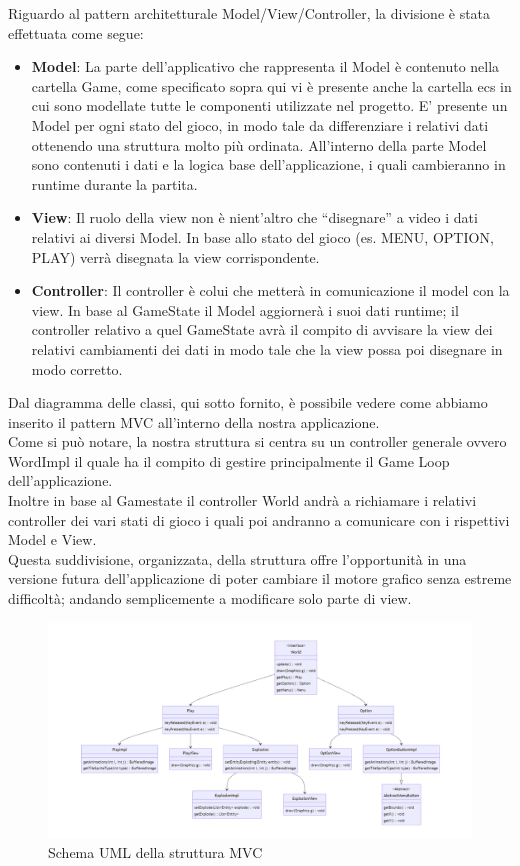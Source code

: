 \documentclass[a4paper,12pt]{report}
\begin{document}
Riguardo al pattern architetturale Model/View/Controller, la divisione è stata effettuata come segue:
\begin{itemize}
    \item \textbf{Model}: La parte dell’applicativo che rappresenta il Model è contenuto nella cartella Game, come specificato sopra qui vi è presente anche la cartella ecs in cui sono modellate tutte le componenti utilizzate nel progetto. E’ presente un Model per ogni stato del gioco, in modo tale da differenziare i relativi dati ottenendo una struttura molto più ordinata. All’interno della parte Model sono contenuti i dati e la logica base dell’applicazione, i quali cambieranno in runtime durante la partita.
    \item \textbf{View}: Il ruolo della view non è nient'altro che “disegnare” a video i dati relativi ai diversi Model. In base allo stato del gioco (es. MENU, OPTION, PLAY) verrà disegnata la view corrispondente.
    \item \textbf{Controller}: Il controller è colui che metterà in comunicazione il model con la view. In base al GameState il Model aggiornerà i suoi dati runtime; il controller relativo a quel GameState avrà il compito di avvisare la view dei relativi cambiamenti dei dati in modo tale che la view possa poi disegnare in modo corretto.
\end{itemize}
Dal diagramma delle classi, qui sotto fornito, è possibile vedere come abbiamo inserito il pattern MVC all’interno della nostra applicazione.
\\
Come si può notare, la nostra struttura si centra su un controller generale ovvero WordImpl il quale ha il compito di gestire principalmente il Game Loop dell'applicazione.
\\
Inoltre in base al Gamestate il controller World andrà a richiamare i relativi controller dei vari stati di gioco i quali poi andranno a comunicare con i rispettivi Model e View.
\\
Questa suddivisione, organizzata, della struttura offre l'opportunità in una versione futura dell’applicazione di poter cambiare il motore grafico senza estreme difficoltà; andando semplicemente a modificare solo parte di view.
\begin{figure}[H]
    \centering{}
    \includegraphics[width=1\textwidth]{img/UMLMVC.png}
    \caption{Schema UML della struttura MVC}
\end{figure}
\end{document}
